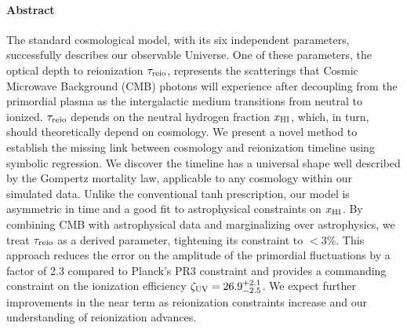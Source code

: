 \paragraph{\large Abstract}  %

The standard cosmological model, with its six independent parameters,
successfully describes our observable Universe.
One of these parameters, the optical depth to reionization $\tau_{\mathrm{reio}}$,
represents the scatterings that Cosmic Microwave Background (CMB)
photons will experience after decoupling from the primordial plasma as
the intergalactic medium transitions from neutral to ionized.
$\tau_{\mathrm{reio}}$ depends on the neutral hydrogen fraction $x_{\mathrm{HI}}$, which, in
turn, should theoretically depend on cosmology.
We present a novel method to establish the missing link between
cosmology and reionization timeline using symbolic regression.
We discover the timeline has a universal shape well described by the
Gompertz mortality law, applicable to any cosmology within our simulated
data.
Unlike the conventional tanh prescription, our model is asymmetric in
time and a good fit to astrophysical constraints on $x_{\mathrm{HI}}$.
By combining CMB with astrophysical data and marginalizing over
astrophysics, we treat $\tau_{\mathrm{reio}}$ as a derived parameter, tightening
its constraint to $<3\%$.
This approach reduces the error on the amplitude of the primordial
fluctuations by a factor of 2.3 compared to Planck's PR3 constraint and
provides a commanding constraint on the ionization efficiency $\zeta_\mathrm{UV} =
26.9^{+2.1}_{-2.5}$.
We expect further improvements in the near term as reionization
constraints increase and our understanding of reionization advances.

